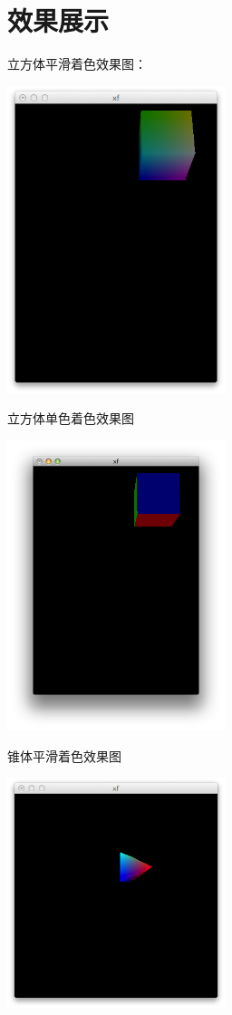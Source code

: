 \documentclass[12pt]{article}
\begin{document}
\section{效果展示}
立方体平滑着色效果图：
\begin{center}
\includegraphics[width = 2.5in]{1.png} 
\end{center}
立方体单色着色效果图
\begin{center}
\includegraphics[width = 2.5in]{2.png} 
\end{center}
锥体平滑着色效果图
\begin{center}
\includegraphics[width = 2.5in]{3.png} 
\end{center}
\end{document}
